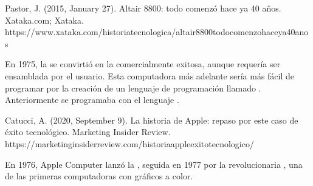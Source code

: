 \documentclass[letterpaper,10pt,spanish]{sphinxmanual}
\begin{document}
\sphinxAtStartPar
%
\begin{footnote}[5]\sphinxAtStartFootnote
Pastor, J. (2015, January 27). Altair 8800: todo comenzó hace ya 40 años. Xataka.com; Xataka. https://www.xataka.com/historia\sphinxhyphen{}tecnologica/altair\sphinxhyphen{}8800\sphinxhyphen{}todo\sphinxhyphen{}comenzo\sphinxhyphen{}hace\sphinxhyphen{}ya\sphinxhyphen{}40\sphinxhyphen{}anos
%
\end{footnote} En 1975, la  se convirtió en la  comercialmente exitosa, aunque requería ser ensamblada por el usuario. Esta computadora más adelante sería más fácil de programar por la creación de un lenguaje de programación llamado . Anteriormente se programaba con el lenguaje .

\sphinxAtStartPar
%
\begin{footnote}[6]\sphinxAtStartFootnote
Catucci, A. (2020, September 9). La historia de Apple: repaso por este caso de éxito tecnológico. Marketing Insider Review. https://marketinginsiderreview.com/historia\sphinxhyphen{}apple\sphinxhyphen{}exito\sphinxhyphen{}tecnologico/
%
\end{footnote} En 1976, Apple Computer lanzó la , seguida en 1977 por la revolucionaria , una de las primeras computadoras con gráficos a color.
\end{document}
